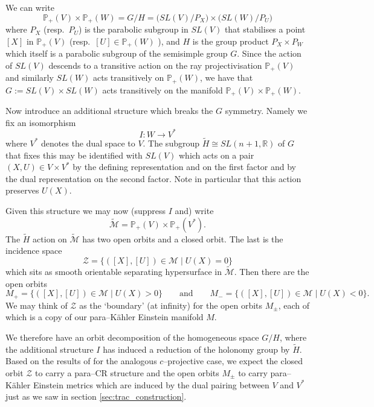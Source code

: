 We can write 
\[
\mathbb{P}_+(V) \times \mathbb{P}_+(W)=G/H=\big( SL(V)/P_X \big)\times \big( SL(W)/P_U \big)
\]
where $P_X$ (resp.\ $P_U$) is the parabolic subgroup in $SL(V)$
that stabilises a point $[X]$ in $\mathbb{P}_+(V)$ (resp.\ $[U] \in \mathbb{P}_+(W)$
), and $H$ is the group product $P_X\times P_W$ which itself is a
parabolic subgroup of the semisimple group $G$.
Since the action of $SL(V)$ descends to a transitive action on the ray projectivisation $\mathbb{P}_+(V)$ and similarly $SL(W)$ acts
transitively on $\mathbb{P}_+(W)$, we have that $G:= SL(V)\times SL(W)$ acts transitively on the manifold $\mathbb{P}_+(V) \times \mathbb{P}_+(W)$.


Now introduce an additional structure which breaks the $G$
symmetry. 
Namely we fix an isomorphism
$$
I:W\to V^*
$$
where $V^*$ denotes the dual space to $V$. The subgroup $\tilde{H}\cong SL(n+1,\mathbb{R})$ of $G$
that fixes this may be identified with $SL(V)$ which acts on a pair
$(X,U)\in V\times V^*$ by the defining representation and on the first
factor and by the dual representation on the second factor. Note in particular that this action preserves $U(X)$.

Given this structure we may now (suppress $I$ and) write
$$
\widetilde{\mathcal{M}}= \mathbb{P}_+(V) \times \mathbb{P}_+(V^*).
$$
The $\tilde{H}$ action on $\widetilde{\mathcal{M}}$ has two open orbits and a closed orbit. The last
is the incidence space 
$$
\mathcal{Z}=\{ ([X],[U])\in \mathcal{M} \mid U(X)=0 \} 
$$
which sits as smooth orientable separating hypersurface in $\widetilde{\mathcal{M}}$. Then there are the open orbits
$$
M_+=\{ ([X],[U])\in \mathcal{M} \mid U(X)>0 \} \qquad \mbox{and} \qquad
M_-=\{ ([X],[U])\in \mathcal{M} \mid U(X)<0 \}.
$$
We may think of $\mathcal{Z}$ as the `boundary' (at infinity) for the open orbits $M_\pm$, each of which is a copy of our para--K\"ahler Einstein manifold $M$.

We therefore have an orbit decomposition of the homogeneous space $G/H$, where the additional structure $I$ has induced a reduction of the holonomy group by $\tilde{H}$. Based on the results of \cite{CGH-duke} for the analogous $c$--projective case, we expect the closed orbit $\mathcal{Z}$ to carry a para--CR structure and the open orbits $M_\pm$ to carry para--K\"ahler Einstein metrics which are induced by the dual pairing between $V$ and $V^*$ just as we saw in section \ref{sec:trac_construction}.




